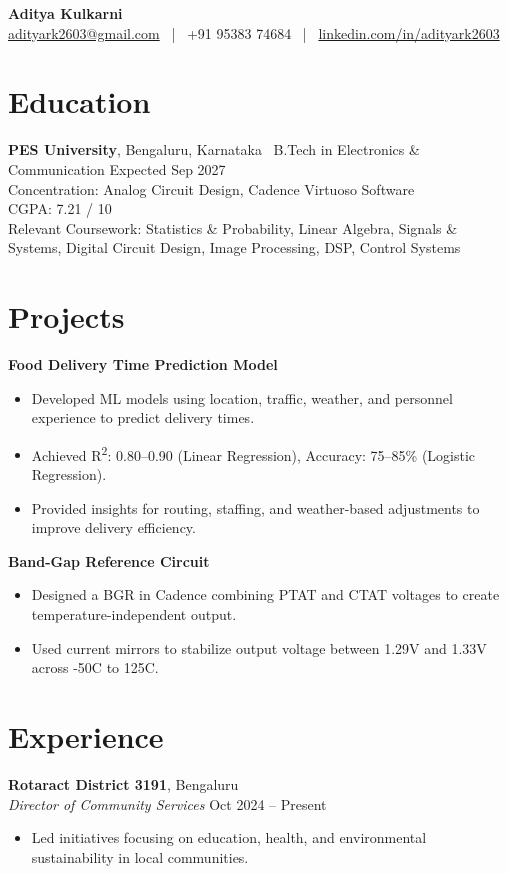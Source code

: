 \documentclass[a4paper,10pt]{article}
\begin{document}
\begin{center}
    \textbf{\LARGE Aditya Kulkarni} \\[4pt]
    \href{mailto:adityark2603@gmail.com}{adityark2603@gmail.com} ~|~ +91 95383 74684 ~|~ \href{https://www.linkedin.com/in/adityark2603}{linkedin.com/in/adityark2603}
\end{center}

\section*{Education}
\textbf{PES University}, Bengaluru, Karnataka \
B.Tech in Electronics \& Communication \hfill Expected Sep 2027 \\
Concentration: Analog Circuit Design, Cadence Virtuoso Software \\
CGPA: 7.21 / 10 \\
Relevant Coursework: Statistics \& Probability, Linear Algebra, Signals \& Systems, Digital Circuit Design, Image Processing, DSP, Control Systems

\section*{Projects}
\textbf{Food Delivery Time Prediction Model} \\
\begin{itemize}[leftmargin=*]
    \item Developed ML models using location, traffic, weather, and personnel experience to predict delivery times.
    \item Achieved R\textsuperscript{2}: 0.80--0.90 (Linear Regression), Accuracy: 75--85\% (Logistic Regression).
    \item Provided insights for routing, staffing, and weather-based adjustments to improve delivery efficiency.
\end{itemize}

\textbf{Band-Gap Reference Circuit} \\
\begin{itemize}[leftmargin=*]
    \item Designed a BGR in Cadence combining PTAT and CTAT voltages to create temperature-independent output.
    \item Used current mirrors to stabilize output voltage between 1.29V and 1.33V across -50\textdegree C to 125\textdegree C.
\end{itemize}

\section*{Experience}
\textbf{Rotaract District 3191}, Bengaluru \\
\textit{Director of Community Services} \hfill Oct 2024 -- Present \\
\begin{itemize}[leftmargin=*]
    \item Led initiatives focusing on education, health, and environmental sustainability in local communities.
\end{itemize}
\end{document}
